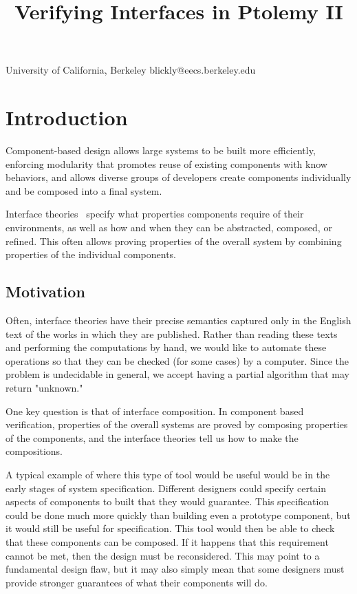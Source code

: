 \documentclass[preprint,11pt]{sigplanconf}
\begin{document}
\title{Verifying Interfaces in Ptolemy II}

           {University of California, Berkeley} {blickly@eecs.berkeley.edu}

\maketitle

\begin{abstract}
\end{abstract}

\section{Introduction}
Component-based design allows large systems to be built more efficiently,
enforcing modularity that promotes reuse of existing components with
know behaviors, and allows diverse groups of developers create components
individually and be composed into a final system. 

Interface theories~\cite{interfaceTheories} specify what properties components
require of their environments, as well as how and when they can be abstracted,
composed, or refined.
This often allows proving
properties of the overall system by combining properties of the individual
components.

\subsection{Motivation}
Often, interface theories have their precise semantics captured only in the
English text of the works in which they are published. Rather than reading these
texts and performing the computations by hand, we would like to automate these
operations so that they can be checked (for some cases) by a computer. Since the
problem is undecidable in general, we accept having a partial algorithm that may
return "unknown."

One key question is that of interface composition.  In component based
verification, properties of the overall systems are proved by composing
properties of the components, and the interface theories tell us how to make
the compositions.

A typical example of where this type of tool would be useful would be in the
early stages of system specification. Different designers could specify certain
aspects of components to built that they would guarantee. This specification
could be done much more quickly than building even a prototype component, but
it would still be useful for specification. This tool would then be able to
check that these components can be composed. If it happens that this
requirement cannot be met, then the design must be reconsidered. This may point
to a fundamental design flaw, but it may also simply mean that some designers
must provide stronger guarantees of what their components will do.
\end{document}
